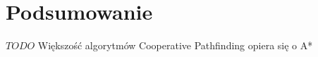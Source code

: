 \chapter{Podsumowanie}
\label{ch:podsumowanie}

$TODO$
Większość algorytmów Cooperative Pathfinding opiera się o A*

